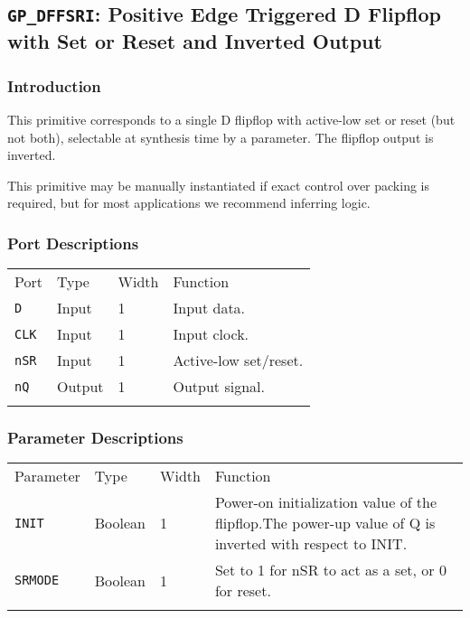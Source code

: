 \documentclass[11pt]{article}
\newcommand{\tokenstyle}[1]{\texttt{#1}}
\newcommand{\whenstyle}[1]{{\fontseries{sb}\selectfont#1}}
\newcommand{\thinhline}{\Xhline{1\arrayrulewidth}}
\newcommand{\thickhline}{\Xhline{2.5\arrayrulewidth}}
\begin{document}
\pagebreak
\subsection{\tokenstyle{GP\_DFFSRI}: Positive Edge Triggered D Flipflop with Set or Reset and Inverted Output}
\label{gp-dffsri}

\subsubsection{Introduction}
This primitive corresponds to a single D flipflop with active-low set or reset (but not both), selectable at synthesis
time by a parameter. The flipflop output is inverted.

This primitive may be manually instantiated if exact control over packing is required, but for most applications we
recommend inferring logic.

\subsubsection{Port Descriptions}

\begin{tabularx}{\textwidth}{lllX}
\thinhline
\whenstyle{Port} & \whenstyle{Type} & \whenstyle{Width} & \whenstyle{Function} \\
\thickhline
\tokenstyle{D} & Input & 1 & Input data. \\
\thinhline
\tokenstyle{CLK} & Input & 1 & Input clock. \\
\thinhline
\tokenstyle{nSR} & Input & 1 & Active-low set/reset. \\
\thinhline
\tokenstyle{nQ} & Output & 1 & Output signal. \\
\thinhline
\end{tabularx}

\subsubsection{Parameter Descriptions}

\begin{tabularx}{\textwidth}{lllX}
\thinhline
\whenstyle{Parameter} & \whenstyle{Type} & \whenstyle{Width} & \whenstyle{Function} \\
\thickhline
\tokenstyle{INIT} & Boolean & 1 & Power-on initialization value of the flipflop.\newline The power-up value of Q is
inverted with respect to INIT.\\
\thinhline
\tokenstyle{SRMODE} & Boolean & 1 & Set to 1 for nSR to act as a set, or 0 for reset. \\
\thinhline
\end{tabularx}
\end{document}
